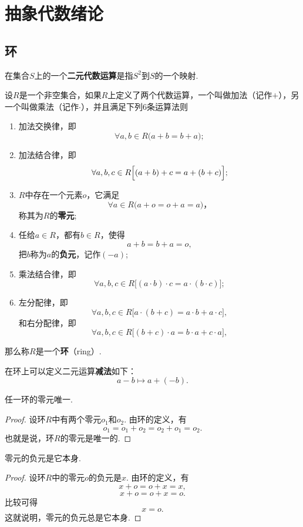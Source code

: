 \chapter{抽象代数绪论}
\section{环}
\begin{definition}
在集合\(S\)上的一个\textbf{二元代数运算}是指\(S^2\)到\(S\)的一个映射.
\end{definition}

\begin{definition}
设\(R\)是一个非空集合，如果\(R\)上定义了两个代数运算，一个叫做加法（记作\(+\)），另一个叫做乘法（记作\(\cdot\)），并且满足下列6条运算法则\begin{enumerate}
\item 加法交换律，即\[
\forall a,b \in R \bigl(a+b = b+a\bigr);
\]
\item 加法结合律，即\[
\forall a,b,c \in R \Bigl[(a+b)+c = a+(b+c)\Bigr];
\]
\item \(R\)中存在一个元素\(o\)，它满足\[
\forall a \in R \bigl( a+o = o+a = a \bigr)，%
\]称其为\(R\)的\textbf{零元};
\item 任给\(a \in R\)，都有\(b \in R\)，使得\[
a+b = b+a = o,
\]把\(b\)称为\(a\)的\textbf{负元}，记作\((-a)\);
\item 乘法结合律，即\[
\forall a,b,c \in R \bigl[ (a \cdot b) \cdot c = a \cdot (b \cdot c) \bigr];
\]
\item 左分配律，即\[
\forall a,b,c \in R \bigl[ a \cdot (b+c) = a \cdot b + a \cdot c \bigr],
\]和右分配律，即\[
\forall a,b,c \in R \bigl[ (b+c) \cdot a = b \cdot a + c \cdot a \bigr],
\]
\end{enumerate}那么称\(R\)是一个\textbf{环}（ring）.

在环上可以定义二元运算\textbf{减法}如下：\[
a - b \mapsto a + (-b).
\]
\end{definition}

\begin{property}
任一环的零元唯一.
\begin{proof}
设环\(R\)中有两个零元\(o_1\)和\(o_2\).
由环的定义，有\[
o_1 = o_1 + o_2 = o_2 + o_1 = o_2.
\]也就是说，环\(R\)的零元是唯一的.
\end{proof}
\end{property}

\begin{property}
零元的负元是它本身.
\begin{proof}
设环\(R\)中的零元\(o\)的负元是\(x\).
由环的定义，有\[
x + o = o + x = x,
\]\[
x + o = o + x = o.
\]比较可得\[
x = o.
\]这就说明，零元的负元总是它本身.
\end{proof}
\end{property}

